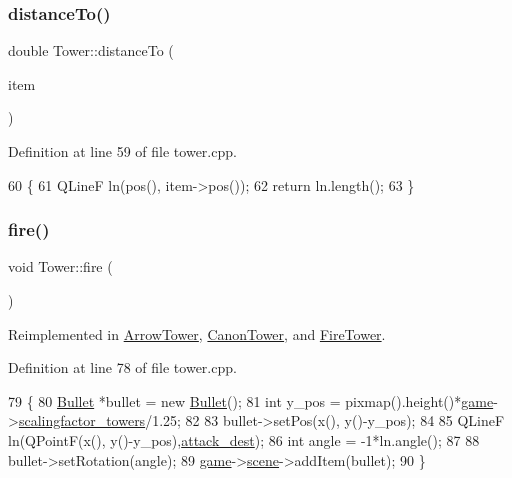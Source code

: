 \subsubsection{\texorpdfstring{distance\+To()}{distanceTo()}}
{\footnotesize\ttfamily double Tower\+::distance\+To (\begin{DoxyParamCaption}\item[{Q\+Graphics\+Item $\ast$}]{item }\end{DoxyParamCaption})}



Definition at line 59 of file tower.\+cpp.


\begin{DoxyCode}
60 \{
61     QLineF ln(pos(), item->pos());
62     \textcolor{keywordflow}{return} ln.length();
63 \}
\end{DoxyCode}
\mbox{\label{class_tower_aa0c9c780f48cffacd3da6877f5d4fdc2}} 
\subsubsection{\texorpdfstring{fire()}{fire()}}
{\footnotesize\ttfamily void Tower\+::fire (\begin{DoxyParamCaption}{ }\end{DoxyParamCaption})\hspace{0.3cm}{\ttfamily [virtual]}}



Reimplemented in \hyperlink{class_arrow_tower_ab4ed87128b5037a98640ab05e8721d88}{Arrow\+Tower}, \hyperlink{class_canon_tower_aa8d13cf8b8d530256b95746620e16234}{Canon\+Tower}, and \hyperlink{class_fire_tower_a9a0b13fcb0bc204194d953c5494afbe3}{Fire\+Tower}.



Definition at line 78 of file tower.\+cpp.


\begin{DoxyCode}
79 \{
80     \hyperlink{class_bullet}{Bullet} *bullet = \textcolor{keyword}{new} \hyperlink{class_bullet}{Bullet}();
81     \textcolor{keywordtype}{int} y\_pos = pixmap().height()*\hyperlink{tower_8cpp_a58bdb5643d0814ac4e697a1564b79b70}{game}->\hyperlink{class_game_a6c1ca48f17f6934432d01bfa7f762a04}{scalingfactor\_towers}/1.25;
82 
83     bullet->setPos(x(), y()-y\_pos);
84 
85     QLineF ln(QPointF(x(), y()-y\_pos),\hyperlink{class_tower_a2b3e8ab90ccceed1fa3a667db80c2c06}{attack\_dest});
86     \textcolor{keywordtype}{int} angle = -1*ln.angle();
87 
88     bullet->setRotation(angle);
89     \hyperlink{tower_8cpp_a58bdb5643d0814ac4e697a1564b79b70}{game}->\hyperlink{class_game_a8119e3b9a632906c6808fa294b46a92a}{scene}->addItem(bullet);
90 \}
\end{DoxyCode}
\mbox{\label{class_tower_ae1d3f44d0149c8146ccf6b262a52ddad}} 
